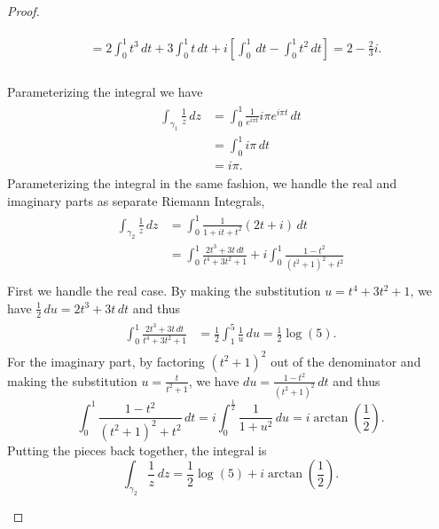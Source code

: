 \documentclass[10pt]{amsart}
\begin{document}
\begin{thm}
\begin{proof}
\begin{alphaenum}
\begin{align*}
\begin{split}
          &= 2\int_0^1t^3\,dt + 3 \int_0^1t\,dt + i\left[\int_0^1\,dt -\int_0^1t^2\,dt\right] = 2 - \frac{2}{3}i.\\
        \end{split}
      \end{align*}
    \item
      Parameterizing the integral we have
      \begin{align*}
        \begin{split}
          \int_{\gamma_1}\frac{1}{z}\,dz &= \int_0^1\frac{1}{e^{i\pi t}}i\pi e^{i\pi t}\,dt\\
          &= \int_0^1 i\pi \,dt\\
          &= i\pi.
        \end{split}
      \end{align*}
      Parameterizing the integral in the same fashion, we handle the real and imaginary parts as separate Riemann Integrals,
      \begin{align*}
        \begin{split}
          \int_{\gamma_2}\frac{1}{z}\,dz &= \int_0^1 \frac{1}{1+it+t^2}(2t+i)\,dt\\
          &= \int_0^1\frac{2t^3 + 3t\,dt}{t^4+3t^2+1} + i\int_0^1\frac{1-t^2}{(t^2+1)^2 + t^2}\\
        \end{split}
      \end{align*}
      First we handle the real case.  By making the substitution $u = t^4 + 3t^2 + 1$, we have $\frac{1}{2}\,du = 2t^3 + 3t\,dt$ and thus
      \begin{align*}
        \begin{split}
          \int_0^1\frac{2t^3 + 3t\,dt}{t^4+3t^2+1} &= \frac{1}{2}\int_1^5 \frac{1}{u}\,du = \frac{1}{2}\log{\left(5\right)}.
        \end{split}
      \end{align*}
      For the imaginary part, by factoring $(t^2+1)^2$ out of the denominator and making the substitution $u = \frac{t}{t^2+1}$, we have $du = \frac{1-t^2}{(t^2+1)^2}\,dt$ and thus
      $$\int_0^1\frac{1-t^2}{(t^2+1)^2 + t^2}\,dt = i\int_0^{\frac{1}{2}}\frac{1}{1+u^2}\,du = i\arctan(\frac{1}{2}).$$
      Putting the pieces back together, the integral is $$\int_{\gamma_2}\frac{1}{z}\,dz = \frac{1}{2}\log(5) + i\arctan\left(\frac{1}{2}\right).$$
    \end{alphaenum}
  \end{proof}
\end{thm}
\end{document}
